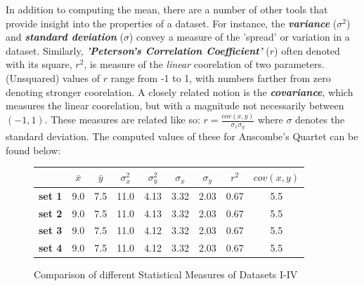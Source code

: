 \documentclass[11pt,a4paper]{article}
\begin{document}
In addition to computing the mean, there are a number of other tools that provide insight into the properties of a dataset. For instance, the \textbf{\textit{variance}} ($\sigma^2$) and \textbf{\textit{standard deviation}} ($\sigma$) convey a measure of the 'spread' or variation in a dataset. Similarly, \textbf{\textit{'Peterson's Correlation Coefficient'}} ($r$) often denoted with its square, $r^2$, is measure of the \textit{linear} coorelation of two parameters. (Unsquared) values of $r$ range from -1 to 1, with numbers farther from zero denoting stronger coorelation. A closely related notion is the \textbf{\textit{covariance}}, which measures the linear coorelation, but with a magnitude not necessarily between $(-1, 1)$. These measures are related like so: $r = \frac{cov(x, y)}{\sigma_x \sigma_y}$ where $\sigma$ denotes the standard deviation. The computed values of these for Anscombe's Quartet can be found below:

\begin{figure}[ht]
\centering
\begin{tabular}{l|c|c|c|c|c|c|c|c|}
\cline{2-9}
                                     & \textbf{$\bar{x}$} & \textbf{$\bar{y}$} & \textbf{$\sigma_x^2$} & \textbf{$\sigma_y^2$} & \textbf{$\sigma_x$} & \textbf{$\sigma_y$} & \textbf{$r^2$} & \textbf{$cov(x, y)$} \\ \hline
\multicolumn{1}{|l|}{\textbf{set 1}} & 9.0                & 7.5              & 11.0                & 4.13                & 3.32                  & 2.03                  & 0.67           & 5.5                  \\ \hline
\multicolumn{1}{|l|}{\textbf{set 2}} & 9.0                & 7.5              & 11.0                & 4.13                & 3.32                  & 2.03                  & 0.67           & 5.5                  \\ \hline
\multicolumn{1}{|l|}{\textbf{set 3}} & 9.0                & 7.5              & 11.0                & 4.12                & 3.32                  & 2.03                  & 0.67           & 5.5                  \\ \hline
\multicolumn{1}{|l|}{\textbf{set 4}} & 9.0                & 7.5              & 11.0                & 4.12                & 3.32                  & 2.03                  & 0.67           & 5.5                  \\ \hline
\end{tabular}
\caption{Comparison of different Statistical Measures of Datasets I-IV}
\label{fig:table}
\end{figure}
\end{document}

